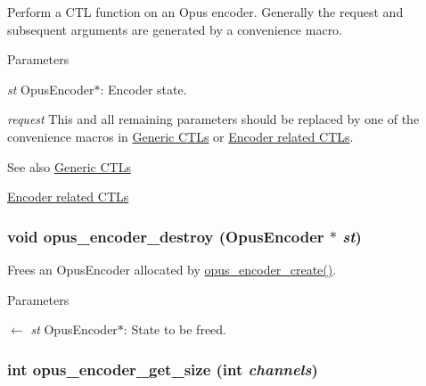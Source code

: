 Perform a CTL function on an Opus encoder. Generally the request and subsequent arguments are generated by a convenience macro. 
\begin{DoxyParams}{Parameters}
\item[{\em st}]{\ttfamily OpusEncoder$\ast$}: Encoder state. \item[{\em request}]This and all remaining parameters should be replaced by one of the convenience macros in \hyperlink{group__opus__genericctls}{Generic CTLs} or \hyperlink{group__opus__encoderctls}{Encoder related CTLs}. \end{DoxyParams}
\begin{DoxySeeAlso}{See also}
\hyperlink{group__opus__genericctls}{Generic CTLs} 

\hyperlink{group__opus__encoderctls}{Encoder related CTLs} 
\end{DoxySeeAlso}
\hypertarget{group__opus__encoder_ga5f4c05b4b51cdffec5a55dbf17bbfa1c}{
\subsubsection[{opus\_\-encoder\_\-destroy}]{\setlength{\rightskip}{0pt plus 5cm}void opus\_\-encoder\_\-destroy ({\bf OpusEncoder} $\ast$ {\em st})}}
\label{group__opus__encoder_ga5f4c05b4b51cdffec5a55dbf17bbfa1c}


Frees an {\ttfamily OpusEncoder} allocated by \hyperlink{group__opus__encoder_gaa89264fd93c9da70362a0c9b96b9ca88}{opus\_\-encoder\_\-create()}. 
\begin{DoxyParams}{Parameters}
\item[\mbox{$\leftarrow$} {\em st}]{\ttfamily OpusEncoder$\ast$}: State to be freed. \end{DoxyParams}
\hypertarget{group__opus__encoder_gaefeb7dc1d6e3b59dea5ea674c86e9c18}{
\subsubsection[{opus\_\-encoder\_\-get\_\-size}]{\setlength{\rightskip}{0pt plus 5cm}int opus\_\-encoder\_\-get\_\-size (int {\em channels})}}
\label{group__opus__encoder_gaefeb7dc1d6e3b59dea5ea674c86e9c18}



